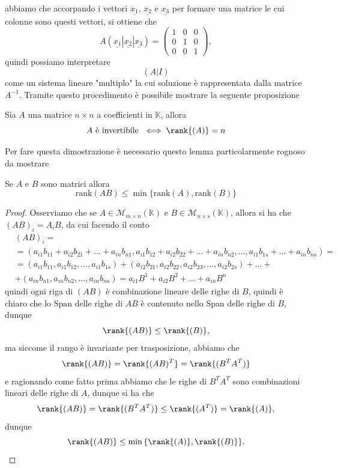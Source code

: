 abbiamo che accorpando i vettori $\underline{x_1}$, $\underline{x_2}$ e $\underline{x_3}$ per formare una matrice le cui colonne sono questi vettori, si ottiene che
$$
  A(\underline{x_1} | \underline{x_2} | \underline{x_3}) = \begin{pmatrix}
    1 & 0 & 0 \\
    0 & 1 & 0 \\
    0 & 0 & 1
  \end{pmatrix},
$$
quindi possiamo interpretare
$$
  (A | I)
$$
come un sistema lineare "multiplo" la cui soluzione è rappresentata dalla matrice $A^{-1}$. Tramite questo procedimento è possibile mostrare la seguente proposizione
\begin{prop} \label{prop:matr_inv_rank}
  Sia $A$ una matrice $n \times n$ a coefficienti in $\mathbb{K}$, allora
  $$
    A \text{ è invertibile } \iff \rank{(A)} = n
  $$
\end{prop}
Per fare questa dimostrazione è necessario questo lemma particolarmente rognoso da mostrare
\begin{lemma} \label{lemma:rg_min}
  Se $A$ e $B$ sono matrici allora
  $$
    \text{rank}(AB) \leq \min{\{\text{rank}(A), \text{rank}(B) \}}
  $$
\end{lemma}
\begin{proof}
  Osserviamo che se $A \in \mathcal{M}_{m \times n}(\mathbb{K})$ e $B \in \mathcal{M}_{n \times s}(\mathbb{K})$, allora si ha che $(AB)_i = A_i B$, da cui facendo il conto
  \begin{align}
    &(AB)_i = \\ 
    &=(a_{i1}b_{11} + a_{i2}b_{21} + \ldots + a_{in}b_{n1}, a_{i1}b_{12} + a_{i2}b_{22} + \ldots + a_{in}b_{n2}, \ldots, a_{i1}b_{1s} + \ldots + a_{in}b_{ns}) = \\
    &= (a_{i1}b_{11}, a_{i1}b_{12}, \ldots, a_{i1}b_{1s}) + (a_{i2}b_{21}, a_{i2}b_{22}, a_{i2}b_{23}, \ldots, a_{i2}b_{2s}) + \ldots + \\
    &+ (a_{in}b_{n1}, a_{in}b_{n2}, \ldots, a_{in}b_{ns}) =a_{i1} B^1 + a_{i2} B^2 + \ldots + a_{in} B^n
  \end{align}
  quindi ogni riga di $(AB)$ è combinazione lineare delle righe di $B$, quindi è chiaro che lo $\text{Span}$ delle righe di $AB$ è contenuto nello Span delle righe di $B$, dunque
  $$
    \rank{(AB)} \leq \rank{(B)},
  $$
  ma siccome il rango è invariante per trasposizione, abbiamo che
  $$
    \rank{(AB)} = \rank{(AB)^T} = \rank{(B^T A^T)}
  $$
  e ragionando come fatto prima abbiamo che le righe di $B^T A^T$ sono combinazioni lineari delle righe di $A$, dunque si ha che
  $$
    \rank{(AB)} = \rank{(B^T A^T)} \leq \rank{(A^T)} = \rank{(A)},
  $$
  dunque
  $$
    \rank{(AB)} \leq \min{\{ \rank{(A)}, \rank{(B)}\} }.
  $$
\end{proof}

